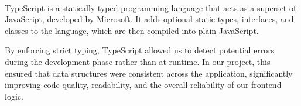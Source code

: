 \paragraph{}TypeScript is a statically typed programming language\cite{typescript} that acts as a superset of JavaScript, developed by Microsoft. It adds optional static types, interfaces, and classes to the language, which are then compiled into plain JavaScript.

By enforcing strict typing, TypeScript allowed us to detect potential errors during the development phase rather than at runtime. In our project, this ensured that data structures were consistent across the application, significantly improving code quality, readability, and the overall reliability of our frontend logic.